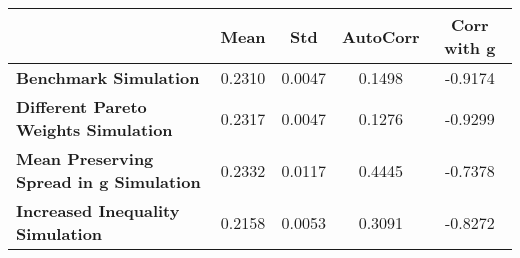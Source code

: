 \begin{tiny}\begin{tabular}{|l|c|c|c|c|}
\hline
&\textbf{Mean}&\textbf{Std}&\textbf{AutoCorr}&\textbf{Corr with g}\\\hline
\textbf{Benchmark Simulation}&0.2310&0.0047&0.1498&-0.9174\\\hline
\textbf{Different Pareto Weights Simulation}&0.2317&0.0047&0.1276&-0.9299\\\hline
\textbf{Mean Preserving Spread in g Simulation}&0.2332&0.0117&0.4445&-0.7378\\\hline
\textbf{Increased Inequality Simulation}&0.2158&0.0053&0.3091&-0.8272\\\hline
\end{tabular}
\end{tiny}